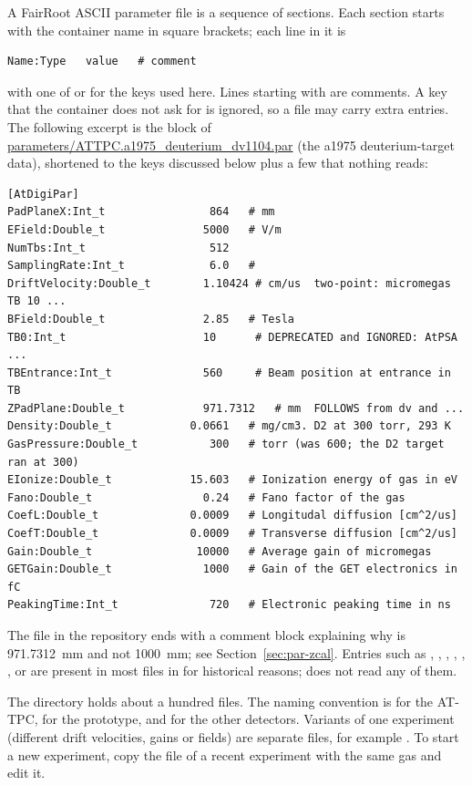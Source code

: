 A FairRoot ASCII parameter file is a sequence of sections. Each section starts with the container
name in square brackets; each line in it is
\begin{verbatim}
Name:Type   value   # comment
\end{verbatim}
with  one of  or  for the keys used here. Lines starting with
\code{\#} are comments. A key that the container does not ask for is ignored, so a file may carry extra
entries. The following excerpt is the \code{[AtDigiPar]} block of
\url{parameters/ATTPC.a1975_deuterium_dv1104.par} (the a1975 deuterium-target data), shortened to the
keys discussed below plus a few that nothing reads:
\begin{verbatim}
[AtDigiPar]
PadPlaneX:Int_t                864   # mm
EField:Double_t               5000   # V/m
NumTbs:Int_t                   512
SamplingRate:Int_t             6.0   #
DriftVelocity:Double_t        1.10424 # cm/us  two-point: micromegas TB 10 ...
BField:Double_t               2.85   # Tesla
TB0:Int_t                     10      # DEPRECATED and IGNORED: AtPSA ...
TBEntrance:Int_t              560     # Beam position at entrance in TB
ZPadPlane:Double_t            971.7312   # mm  FOLLOWS from dv and ...
Density:Double_t            0.0661   # mg/cm3. D2 at 300 torr, 293 K
GasPressure:Double_t           300   # torr (was 600; the D2 target ran at 300)
EIonize:Double_t            15.603   # Ionization energy of gas in eV
Fano:Double_t                 0.24   # Fano factor of the gas
CoefL:Double_t              0.0009   # Longitudal diffusion [cm^2/us]
CoefT:Double_t              0.0009   # Transverse diffusion [cm^2/us]
Gain:Double_t                10000   # Average gain of micromegas
GETGain:Double_t              1000   # Gain of the GET electronics in fC
PeakingTime:Int_t              720   # Electronic peaking time in ns
\end{verbatim}
The file in the repository ends with a comment block explaining why  is 971.7312~mm
and not 1000~mm; see Section~\ref{sec:par-zcal}. Entries such as , ,
, , , ,  or
 are present in most files in  for historical reasons;
 does not read any of them.

The  directory holds about a hundred files. The naming convention is
 for the AT-TPC,  for the prototype,
 and  for the other detectors. Variants of one experiment
(different drift velocities, gains or fields) are separate files, for example
. To start a new experiment, copy the file of a recent
experiment with the same gas and edit it.

